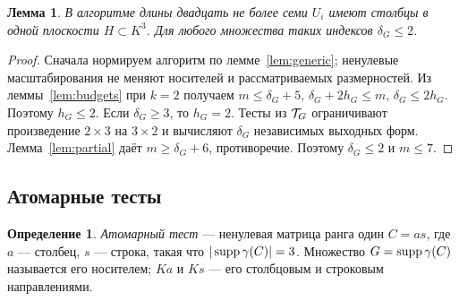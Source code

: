 \documentclass[11pt,a4paper]{article}
\numberwithin{equation}{section}
\theoremstyle{plain}
\newtheorem{lemma}[theorem]{Лемма}
\theoremstyle{definition}
\newtheorem{definition}[theorem]{Определение}
\newcommand{\leqs}{\leqslant}\newcommand{\geqs}{\geqslant}
\begin{document}
\begin{lemma}\label{lem:plane}
В алгоритме длины двадцать не более семи $U_i$ имеют столбцы в одной
плоскости $H\subset K^3$. Для любого множества таких индексов
$\delta_G\leqs2$.
\end{lemma}
\begin{proof}
Сначала нормируем алгоритм по лемме~\ref{lem:generic}; ненулевые
масштабирования не меняют носителей и рассматриваемых размерностей.
Из леммы~\ref{lem:budgets} при $k=2$ получаем
$m\leqs\delta_G+5$, $\delta_G+2h_G\leqs m$,
$\delta_G\leqs2h_G$. Поэтому $h_G\leqs2$.
Если $\delta_G\geqs3$, то $h_G=2$. Тесты из $\mathcal T_G$ ограничивают
произведение $2\times3$ на $3\times2$ и вычисляют $\delta_G$ независимых
выходных форм. Лемма~\ref{lem:partial} даёт $m\geqs\delta_G+6$,
противоречие. Поэтому $\delta_G\leqs2$ и $m\leqs7$.
\end{proof}

\subsection{Атомарные тесты}

\begin{definition}
\emph{Атомарный тест} --- ненулевая матрица ранга один $C=as$, где
$a$ --- столбец, $s$ --- строка, такая что
$|\operatorname{supp}\gamma(C)|=3$. Множество $G=\operatorname{supp}\gamma(C)$ называется его
носителем; $Ka$ и $Ks$ --- его столбцовым и строковым направлениями.
\end{definition}
\end{document}
